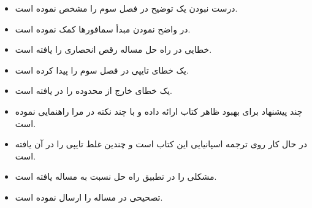 \documentclass{book}
\begin{document}
\begin{itemize}
\item {}
    درست نبودن یک توضیح در فصل سوم را مشخص نموده است. 


\item  {} 
    در واضح نمودن مبدأ سمافورها کمک نموده است. 

\item {} 
    خطایی در راه حل مساله رقص انحصاری را یافته است. 

\item {} یک خطای تایپی در فصل سوم را پیدا کرده است. 

\item {} 
    یک خطای خارج از محدوده را در  یافته است. 

\item {}
    چند پیشنهاد برای بهبود ظاهر کتاب ارائه داده و با چند نکته در \lr{\LaTeX} مرا راهنمایی نموده است. 
    
\item   {} 
    در حال کار روی ترجمه اسپانیایی این کتاب است و چندین غلط تایپی را در آن یافته است. 

\item {} 
    مشکلی را در تطبیق راه حل  نسبت به مساله  یافته است. 

\item {}
    تصحیحی در مساله  را ارسال نموده است. 
    

\end{itemize}
\end{document}
